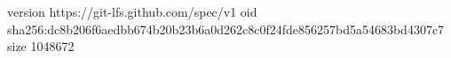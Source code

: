 version https://git-lfs.github.com/spec/v1
oid sha256:dc8b206f6aedbb674b20b23b6a0d262c8c0f24fde856257bd5a54683bd4307c7
size 1048672
